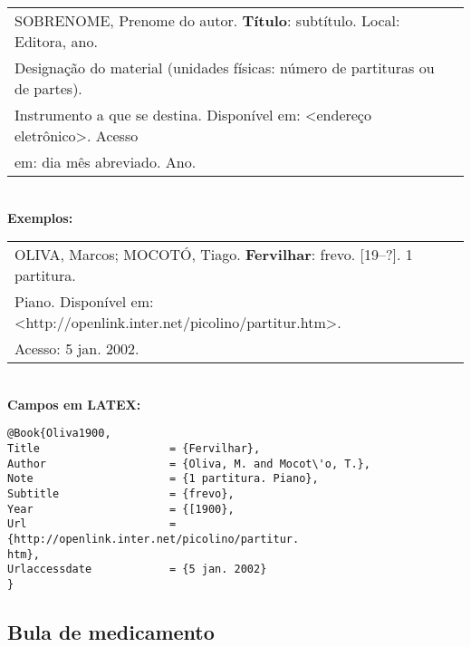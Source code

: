 \begin{tabular}{|l|c|} \hline
	SOBRENOME, Prenome do autor. \textbf{Título}: subtítulo. Local: Editora, 
	ano.                                                                       \\Designação do material (unidades físicas: número de
	partituras ou de partes).                                                  \\Instrumento a que se destina. Disponível
	em: <endereço eletrônico>. Acesso                                        \\em: dia mês abreviado. Ano. 
	                                                                           \\\hline
\end{tabular} \\
	
\textbf{Exemplos:} \\
	
\begin{tabular}{|l|c|} \hline
	OLIVA, Marcos; MOCOTÓ, Tiago. \textbf{Fervilhar}: frevo. [19--?]. 1 partitura. 
	                                                                                \\Piano. Disponível em: <http://openlink.inter.net/picolino/partitur.htm>.
	                                                                                \\Acesso: 5 jan. 2002. 
	                                                                                \\\hline
\end{tabular} \\
	
\textbf{Campos em LATEX:} 
	
\begingroup
\fontsize{10pt}{12pt}\selectfont
\begin{verbatim}
@Book{Oliva1900,
Title                    = {Fervilhar},
Author                   = {Oliva, M. and Mocot\'o, T.},
Note                     = {1 partitura. Piano},
Subtitle                 = {frevo},
Year                     = {[1900},
Url                      = {http://openlink.inter.net/picolino/partitur.
htm},
Urlaccessdate            = {5 jan. 2002}
}
\end{verbatim}
\endgroup
	
\subsection{Bula de medicamento}
	
